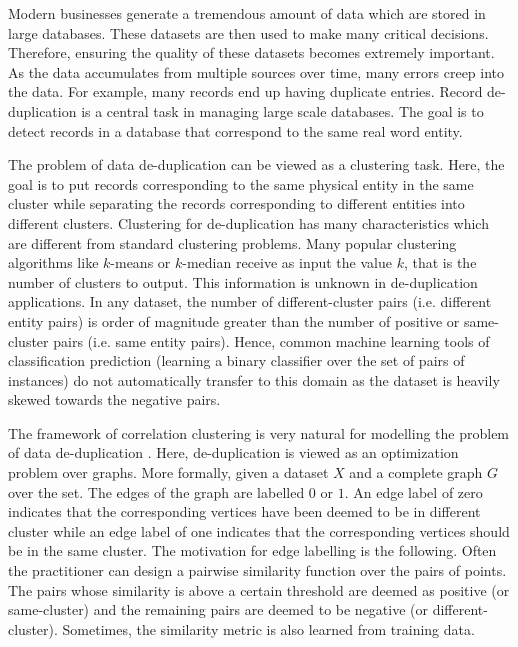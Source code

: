 \documentclass[12pt]{article}
\begin{document}
\fi

Modern businesses generate a tremendous amount of data which are stored in large databases. These datasets are then used to make many critical decisions. Therefore, ensuring the quality of these datasets becomes extremely important. As the data accumulates from multiple sources over time, many errors creep into the data. For example, many records end up having duplicate entries. Record de-duplication is a central task in managing large scale databases. The goal is to detect records in a database that correspond to the same real word entity. 

The problem of data de-duplication can be viewed as a clustering task. Here, the goal is to put records corresponding to the same physical entity in the same cluster while separating the records corresponding to different entities into different clusters. Clustering for de-duplication has many characteristics which are different from standard clustering problems. Many popular clustering algorithms like $k$-means or $k$-median receive as input the value $k$, that is the number of clusters to output. This information is unknown in de-duplication applications. In any dataset, the number of different-cluster pairs (i.e. different entity pairs) is order of magnitude greater than the number of positive or same-cluster pairs (i.e. same entity pairs). Hence, common machine learning tools of classification prediction (learning a binary classifier over the set of pairs of instances) do not automatically transfer to this domain as the dataset is heavily skewed towards the negative pairs. 

The framework of correlation clustering is very natural for modelling the problem of data de-duplication \cite{bansal2004correlation}. Here, de-duplication is viewed as an optimization problem over graphs. More formally, given a dataset $X$ and a complete graph $G$ over the set. The edges of the graph are labelled $0$ or $1$. An edge label of zero indicates that the corresponding vertices have been deemed to be in different cluster while an edge label of one indicates that the corresponding vertices should be in the same cluster. The motivation for edge labelling is the following. Often the practitioner can design a pairwise similarity function over the pairs of points. The pairs whose similarity is above a certain threshold are deemed as positive (or same-cluster) and the remaining pairs are deemed to be negative (or different-cluster). Sometimes, the similarity metric is also learned from training data. 
\end{document}
